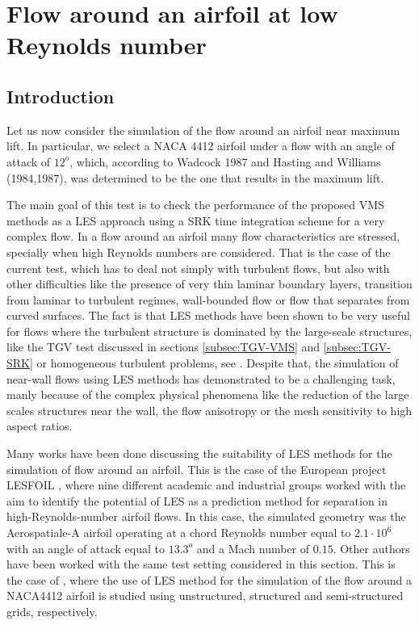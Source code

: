 \chapter{Flow around an airfoil at low Reynolds number}
\label{chap-NACA}

\section{Introduction}
\label{sec-C8_introduction}
Let us now consider the simulation of the flow around an airfoil near maximum lift. In particular, we select a NACA 4412 airfoil under a flow with an angle of attack of $12^o$, which, according to Wadcock 1987 and Hasting and Williams (1984,1987), was determined to be the one that results in the maximum lift.

The main goal of this test is to check the performance of the proposed VMS methods as a LES approach using a SRK time integration scheme for a very complex flow. In a flow around an airfoil many flow characteristics are stressed, specially when high Reynolds numbers are considered. That is the case of the current test, which has to deal not simply with turbulent flows, but also with other difficulties like the presence of very thin laminar boundary layers, transition from laminar to turbulent regimes, wall-bounded flow or flow that separates from curved surfaces. The fact is that LES methods have been shown to be very useful for flows where the turbulent structure is dominated by the large-scale structures, like the TGV test discussed in sections \ref{subsec:TGV-VMS} and \ref{subsec:TGV-SRK} or homogeneous turbulent problems, see \cite{colomes_2014}. Despite that, the simulation of near-wall flows using LES methods has demonstrated to be a challenging task, manly because of the complex physical phenomena like the reduction of the large scales structures near the wall, the flow anisotropy or the mesh sensitivity to high aspect ratios. 

Many works have been done discussing the suitability of LES methods for the simulation of flow around an airfoil. This is the case of the European project LESFOIL \cite{davidson_lesfoil:_2003}, where nine different academic and industrial groups worked with the aim to identify the potential of LES as a prediction method for separation in high-Reynolds-number airfoil flows. In this case, the simulated geometry was the Aerospatiale-A airfoil operating at a chord Reynolds number equal to $2.1\cdot10^6$ with an angle of attack equal to $13.3^o$ and a Mach number of $0.15$. Other authors have been worked with the same test setting considered in this section. This is the case of \cite{jansen_stabilized_1999, kaltenbach_large-eddy_1995, schmidt_assessment_????}, where the use of LES method for the simulation of the flow around a NACA4412 airfoil is studied using unstructured, structured and semi-structured grids, respectively.

